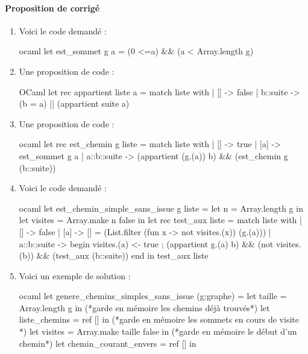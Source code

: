 \documentclass[a4paper, 11pt]{article}
\newenvironment{code-env}
{
  \mdfsetup{
    roundcorner=2pt,
    topline=true,
    leftline=true,
    bottomline=true,
    rightline=true,
    innertopmargin=4pt,
    innerbottommargin=4pt,
    innerrightmargin=4pt,
    innerlinewidth=1pt,
    backgroundcolor={gray!10},
    linecolor={gray!40},
    linewidth=0.1pt,
  }
  \begin{mdframed}[]
  }{\end{mdframed}}
\newenvironment{fancy-code}[1]
  {\VerbatimEnvironment
    \begin{code-env}
    \begin{verbatim}}
 {\end{verbatim}\end{code-env}}
\begin{document}
\paragraph*{Proposition de corrigé}
  \begin{enumerate}
     \item  Voici le code demandé : 
     \smallskip
         \begin{fancy-code}{ocaml}
let est_sommet g a =  (0 <=a) && (a < Array.length g)
         \end{fancy-code}

        
     \item Une proposition de code : 
     \smallskip
\begin{fancy-code}{OCaml}
let rec appartient liste a = match liste with
    | [] -> false 
    | b::suite -> (b = a) || (appartient suite a)
\end{fancy-code}
         
     \item Une proposition de code :
     \smallskip
\begin{fancy-code}{ocaml}
let rec est_chemin g liste = match liste with
   | [] -> true
   | [a] -> est_sommet g a 
   | a::b::suite -> (appartient (g.(a)) b) && (est_chemin g (b::suite)) 

\end{fancy-code}
\item Voici le code demandé : 
\smallskip
    \begin{fancy-code}{ocaml}
 let est_chemin_simple_sans_issue g liste =
    let n = Array.length g in
    let visites = Array.make n false in
    let rec test_aux liste = match liste with
        | [] -> false
        | [a] -> [] = (List.filter (fun x -> not visites.(x)) (g.(a)))
        | a::b::suite -> 
            begin
                visites.(a) <- true ;
                (appartient g.(a) b) && (not visites.(b)) 
                && (test_aux (b::suite))
            end
        in 
        test_aux liste
    \end{fancy-code}

\item  Voici un exemple de solution : 
\smallskip

    \begin{fancy-code}{ocaml}
let genere_chemins_simples_sans_issue (g:graphe) =
  let taille = Array.length g in
  (*garde en mémoire les chemins déjà trouvés*)
  let liste_chemins = ref [] in
  (*garde en mémoire les sommets en cours de visite *)
  let visites = Array.make taille false in
  (*garde en mémoire le début d'un chemin*)
  let chemin_courant_envers = ref [] in


\end{fancy-code}
\end{enumerate}
\end{document}
